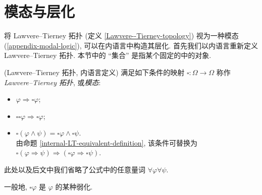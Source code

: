 


\section{模态与层化}

将 Lawvere--Tierney 拓扑 (定义 \ref{Lawvere--Tierney-topology}) 视为一种模态 (\ref{appendix-modal-logic}), 可以在内语言中构造其层化. 首先我们以内语言重新定义 Lawvere--Tierney 拓扑. 本节中的 ``集合'' 是指某个固定的\topos{}中的对象.

\begin{definition}
	[label={Lawvere--Tierney-topology-internal-definition}]
	{(Lawvere--Tierney 拓扑, 内语言定义)}
	满足如下条件的映射 $\square\colon \Omega\to\Omega$ 称作\emph{Lawvere--Tierney 拓扑}, 或\emph{模态}:
	\begin{itemize}
		\item $\varphi\Rightarrow \square \varphi$;
		\item $\square\square\varphi \Rightarrow \square\varphi$;
		\item $\square(\varphi \land \psi) = \square\varphi\land \square\psi$.
		\\
		由命题 \ref{internal-LT-equivalent-definition}, 该条件可替换为 $\square(\varphi \Rightarrow \psi) \Rightarrow (\square\varphi \Rightarrow \square\psi)$.
	\end{itemize}
	此处以及后文中我们省略了公式中的任意量词 $\forall\varphi\forall\psi$.
\end{definition}

一般地, $\square \varphi$ 是 $\varphi$ 的某种弱化.

